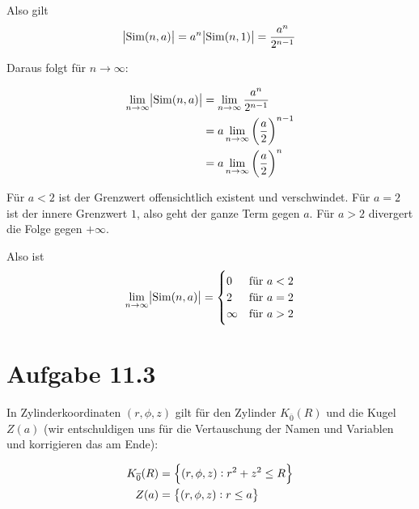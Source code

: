 \documentclass[a4paper,german,12pt,smallheadings]{scrartcl}
\begin{document}

Also gilt
\begin{equation*}
  \envert{\operatorname{Sim}(n,a)} = a^n \envert{\operatorname{Sim}(n,1)} = \frac{a^n}{2^{n-1}}
\end{equation*}

Daraus folgt für $n \to \infty$:

\begin{align*}
  \lim\limits_{n \to \infty} \envert{\operatorname{Sim}(n,a)} &= \lim\limits_{n \to \infty} \frac{a^n}{2^{n-1}} \\
                                                              &= a \lim\limits_{n \to \infty} \del{\frac{a}{2}}^{n-1} \\
                                                              &= a \lim\limits_{n \to \infty} \del{\frac{a}{2}}^{n}
\end{align*}

Für $a < 2$ ist der Grenzwert offensichtlich existent und verschwindet. %
Für $a = 2$ ist der innere Grenzwert $1$, also geht der ganze Term gegen $a$.
Für $a > 2$ divergert die Folge gegen $+ \infty$.

Also ist
\begin{align*}
  \lim\limits_{n \to \infty} \envert{\operatorname{Sim}(n,a)} =
  \begin{cases} 
    0 &\mbox{für } a < 2 \\
    2 & \mbox{für } a = 2 \\
    \infty & \mbox{für } a > 2 \\
    \end{cases}
\end{align*}

\section*{Aufgabe 11.3}

In Zylinderkoordinaten $(r, \phi, z)$ gilt für den Zylinder
$K_{\overline{0}}(R)$ und die Kugel $Z(a)$ (wir entschuldigen uns für die
Vertauschung der Namen und Variablen und korrigieren das am Ende):

\begin{align*}
  K_{\overline{0}}(R) &= \cbr{(r, \phi, z): r^2 + z^2 \le R} \\
  Z(a) &= \cbr{(r, \phi, z): r \le a} \\
\end{align*}
\end{document}
